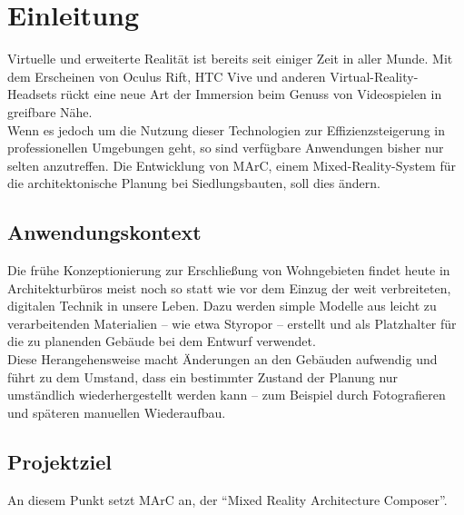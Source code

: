\section{Einleitung}
Virtuelle und erweiterte Realität ist bereits seit einiger Zeit in aller Munde. Mit dem Erscheinen von Oculus Rift, HTC Vive und anderen Virtual-Reality-Headsets rückt eine neue Art der Immersion beim Genuss von Videospielen in greifbare Nähe.\\
Wenn es jedoch um die Nutzung dieser Technologien zur Effizienzsteigerung in professionellen Umgebungen geht, so sind verfügbare Anwendungen bisher nur selten anzutreffen.
Die Entwicklung von MArC, einem Mixed-Reality-System für die architektonische Planung bei Siedlungsbauten, soll dies ändern.
\subsection{Anwendungskontext}
Die frühe Konzeptionierung zur Erschließung von Wohngebieten findet heute in Architekturbüros meist noch so statt wie vor dem Einzug der weit verbreiteten, digitalen Technik in unsere Leben. Dazu werden simple Modelle aus leicht zu verarbeitenden Materialien -- wie etwa Styropor -- erstellt und als Platzhalter für die zu planenden Gebäude bei dem Entwurf verwendet.\\
Diese Herangehensweise macht Änderungen an den Gebäuden aufwendig und führt zu dem Umstand, dass ein bestimmter Zustand der Planung nur umständlich wiederhergestellt werden kann -- zum Beispiel durch Fotografieren und späteren manuellen Wiederaufbau.
\subsection{Projektziel}
An diesem Punkt setzt MArC an, der "`Mixed Reality Architecture Composer"'. 
